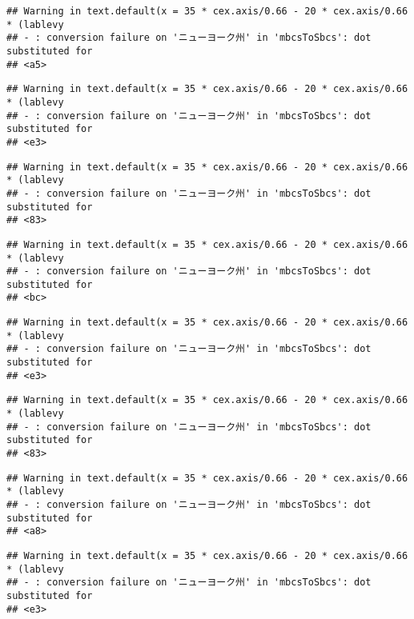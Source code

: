 \documentclass[
]{article}
\begin{document}
\begin{verbatim}
## Warning in text.default(x = 35 * cex.axis/0.66 - 20 * cex.axis/0.66 * (lablevy
## - : conversion failure on 'ニューヨーク州' in 'mbcsToSbcs': dot substituted for
## <a5>
\end{verbatim}

\begin{verbatim}
## Warning in text.default(x = 35 * cex.axis/0.66 - 20 * cex.axis/0.66 * (lablevy
## - : conversion failure on 'ニューヨーク州' in 'mbcsToSbcs': dot substituted for
## <e3>
\end{verbatim}

\begin{verbatim}
## Warning in text.default(x = 35 * cex.axis/0.66 - 20 * cex.axis/0.66 * (lablevy
## - : conversion failure on 'ニューヨーク州' in 'mbcsToSbcs': dot substituted for
## <83>
\end{verbatim}

\begin{verbatim}
## Warning in text.default(x = 35 * cex.axis/0.66 - 20 * cex.axis/0.66 * (lablevy
## - : conversion failure on 'ニューヨーク州' in 'mbcsToSbcs': dot substituted for
## <bc>
\end{verbatim}

\begin{verbatim}
## Warning in text.default(x = 35 * cex.axis/0.66 - 20 * cex.axis/0.66 * (lablevy
## - : conversion failure on 'ニューヨーク州' in 'mbcsToSbcs': dot substituted for
## <e3>
\end{verbatim}

\begin{verbatim}
## Warning in text.default(x = 35 * cex.axis/0.66 - 20 * cex.axis/0.66 * (lablevy
## - : conversion failure on 'ニューヨーク州' in 'mbcsToSbcs': dot substituted for
## <83>
\end{verbatim}

\begin{verbatim}
## Warning in text.default(x = 35 * cex.axis/0.66 - 20 * cex.axis/0.66 * (lablevy
## - : conversion failure on 'ニューヨーク州' in 'mbcsToSbcs': dot substituted for
## <a8>
\end{verbatim}

\begin{verbatim}
## Warning in text.default(x = 35 * cex.axis/0.66 - 20 * cex.axis/0.66 * (lablevy
## - : conversion failure on 'ニューヨーク州' in 'mbcsToSbcs': dot substituted for
## <e3>
\end{verbatim}
\end{document}
